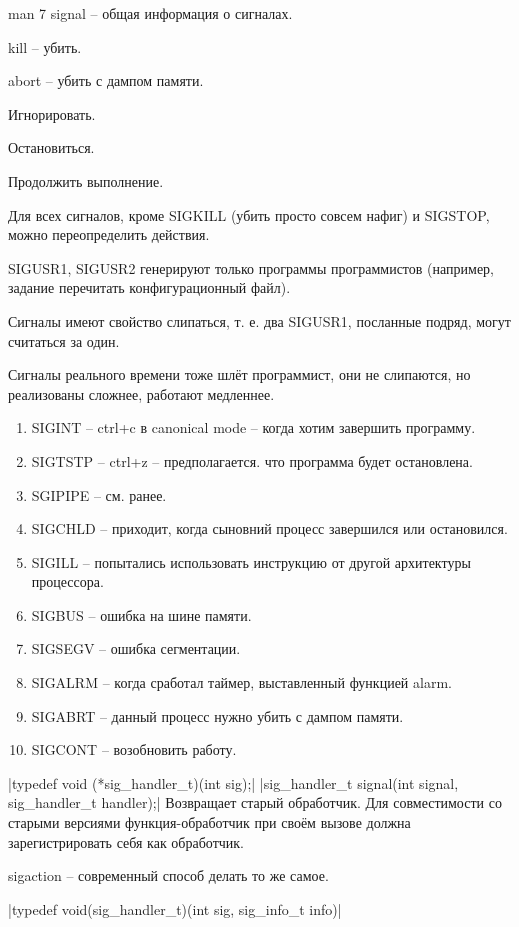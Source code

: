 \documentclass[a4paper,10pt]{article}
\newcommand{\cl}{\mint{c}}
\begin{document}
man 7 signal -- общая информация о сигналах. 

kill -- убить.

abort -- убить с дампом памяти.

Игнорировать.

Остановиться.

Продолжить выполнение.

Для всех сигналов, кроме SIGKILL (убить просто совсем нафиг) и SIGSTOP, можно переопределить действия.

SIGUSR1, SIGUSR2 генерируют только программы программистов (например, задание перечитать конфигурационный файл).

Сигналы имеют свойство слипаться, т. е. два SIGUSR1, посланные подряд, могут считаться за один. 

Сигналы реального времени тоже шлёт программист, они не слипаются, но реализованы сложнее, работают медленнее.

\begin{enumerate}
\item SIGINT -- ctrl+c в canonical mode -- когда хотим завершить программу.
\item SIGTSTP -- ctrl+z -- предполагается. что программа будет остановлена.
\item SGIPIPE -- см. ранее.
\item SIGCHLD -- приходит, когда сыновний процесс завершился или остановился.
\item SIGILL -- попытались использовать инструкцию от другой архитектуры процессора.
\item SIGBUS -- ошибка на шине памяти.
\item SIGSEGV -- ошибка сегментации.
\item SIGALRM -- когда сработал таймер, выставленный функцией alarm.
\item SIGABRT -- данный процесс нужно убить с дампом памяти.
\item SIGCONT -- возобновить работу.
\end{enumerate}

\cl|typedef void (*sig_handler_t)(int sig);|
\cl|sig_handler_t signal(int signal, sig_handler_t handler);|
Возвращает старый обработчик. Для совместимости со старыми версиями функция-обработчик при своём вызове должна зарегистрировать себя как обработчик.

sigaction -- современный способ делать то же самое.

\cl|typedef void(sig_handler_t)(int sig, sig_info_t info)|
\end{document}
